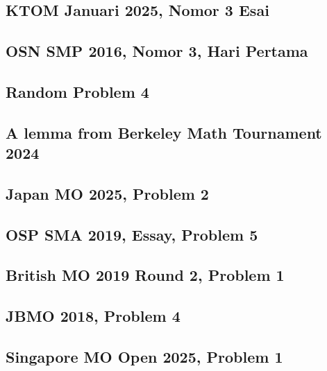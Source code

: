 \subsection{KTOM Januari 2025, Nomor 3 Esai}


\subsection{OSN SMP 2016, Nomor 3, Hari Pertama}


\subsection{Random Problem 4}


\subsection{A lemma from Berkeley Math Tournament 2024}


\subsection{Japan MO 2025, Problem 2}


\subsection{OSP SMA 2019, Essay, Problem 5}


\subsection{British MO 2019 Round 2, Problem 1}


\subsection{JBMO 2018, Problem 4}


\subsection{Singapore MO Open 2025, Problem 1}


